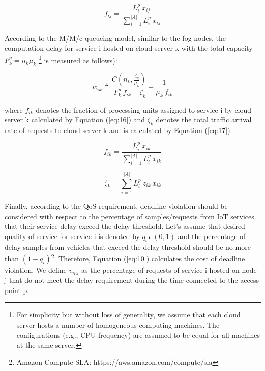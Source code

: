 \documentclass[twocolumn]{article}
\begin{document}
\begin{equation}
f_{ij}=\frac{L_{i}^{p} \ x_{ij}}{\sum_{i=1}^{|A|} L_{i}^{p} \ x_{ij} }
\label{eq:14}
\end{equation}

According to the M/M/c queueing model, similar to the fog nodes, the computation delay for service i hosted on cloud server k with the total capacity $F^{p}_{k} = n_{k} \mu_{k}$ \footnote{For simplicity but without loss of generality, we assume that each cloud server hosts a number of homogeneous computing machines. The configurations (e.g., CPU frequency) are assumed to be equal for all machines at the same server.} is measured as follows\cite{deng2016optimal,yousefpour2019fogplan}):

\begin{equation}
w_{ik} \triangleq  
\frac{C(n_{k},\frac{\zeta_{k}}{\mu_{k}})}{\ F^{p}_{k} \ f_{ik}-\zeta_{k}}+
\frac{1}{\mu_{k} \ f_{ik}}
\label{eq:15}
\end{equation}

where $f_{ik}$ denotes the fraction of processing units assigned to service i by cloud server k calculated by Equation (\ref{eq:16}) and $\zeta_{k}$ denotes the total traffic arrival rate of requests to cloud server k and is calculated by Equation (\ref{eq:17}).

\begin{equation}
f_{ik}=\frac{L_{i}^{p} \ x_{ik}}{\sum_{i=1}^{|A|} L_{i}^{p} \ x_{ik} }
\label{eq:16}
\end{equation}

\begin{equation}
\zeta_{k} = \sum_{i=1}^{|A|} L_{i}^{p} \ z_{ik} \ x_{ik}  
\label{eq:17}
\end{equation}

\par Finally, according to the QoS requirement, deadline violation should be considered with respect to the percentage of samples/requests from IoT services that their service delay exceed the delay threshold. 
Let's assume that desired quality of service for service i is denoted by $q_{i}\,\epsilon\,(0,1)$ and the percentage of delay samples from vehicles that exceed the delay threshold should be no more than $(1 - q_{i}) $\footnote{Amazon Compute SLA: https://aws.amazon.com/compute/sla}. Therefore, Equation (\ref{eq:10}) calculates the cost of deadline violation. We define $v_{ipj}$ as the percentage of requests of service i hosted on node j that do not meet the delay requirement during the time connected to the access point p. 
\end{document}
